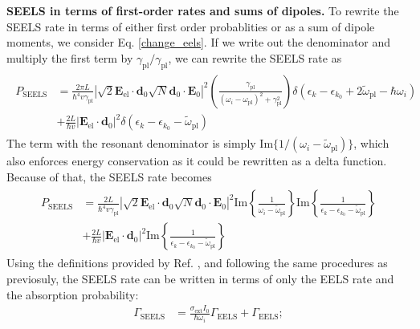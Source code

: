 \documentclass [11pt, proquest] {uwthesis}[2016/11/22]
\begin{document}
{\bf SEELS in terms of first-order rates and sums of dipoles.} To rewrite the SEELS rate in terms of either first order probablities or as a sum of dipole moments, we consider Eq. \ref{change_eels}. If we write out the denominator and multiply the first term by $\gamma_{\textrm{pl}}/\gamma_{\textrm{pl}}$, we can rewrite the SEELS rate as
\begin{align}
\begin{split}
  P_{\textrm{SEELS}} &= \frac{2\pi L}{\hbar^4v\gamma_{\textrm{pl}}}\left|\sqrt{2}\textbf{E}_{\textrm{el}}\cdot\textbf{d}_0 \sqrt{N}\textbf{d}_0\cdot\textbf{E}_{0}\right|^2\left(\frac{\gamma_{\textrm{pl}}}{(\omega_i - \omega_{\textrm{pl}})^2 + \gamma_{\textrm{pl}}^2}\right)\delta(\epsilon_k - \epsilon_{k_0} + 2\tilde{\omega}_{\textrm{pl}} - \hbar\omega_i)\\
  &+ \frac{2L}{\hbar v}|\textbf{E}_{\textrm{el}}\cdot\textbf{d}_0|^2\delta(\epsilon_k - \epsilon_{k_0} - \tilde{\omega}_{\textrm{pl}})
  \label{mult_gamma}
  \end{split}
\end{align}
The term with the resonant denominator is simply $\textrm{Im}\{1/(\omega_i - \tilde{\omega}_{\textrm{pl}})\}$, which also enforces energy conservation as it could be rewritten as a delta function. Because of that, the SEELS rate becomes
\begin{align}
\begin{split}
  P_{\textrm{SEELS}} &= \frac{2 L}{\hbar^4v\gamma_{\textrm{pl}}}\left|\sqrt{2}\textbf{E}_{\textrm{el}}\cdot\textbf{d}_0 \sqrt{N}\textbf{d}_0\cdot\textbf{E}_{0}\right|^2\textrm{Im}\left\{\frac{1}{\omega_i - \tilde{\omega}_{\textrm{pl}}}\right\}\textrm{Im}\left\{\frac{1}{\epsilon_k - \epsilon_{k_0} - \tilde{\omega}_{\textrm{pl}}}\right\}\\
  &+ \frac{2L}{\hbar v}|\textbf{E}_{\textrm{el}}\cdot\textbf{d}_0|^2\textrm{Im}\left\{\frac{1}{\epsilon_k - \epsilon_{k_0} - \tilde{\omega}_{\textrm{pl}}}\right\}
  \label{imag}
  \end{split}
\end{align}
Using the definitions provided by Ref. \cite{EEGS}, and following the same procedures as previosuly, the SEELS rate can be written in terms of only the EELS rate and the absorption probability:
\begin{equation}
\begin{split}
  \Gamma_{\textrm{SEELS}} &= \frac{\sigma_{\textrm{ext}}I_0}{\hbar\omega_i}\Gamma_{\textrm{EELS}} + \Gamma_{\textrm{EELS}};
  \label{seels_rate_first_imag}
  \end{split}
\end{equation}
\end{document}
